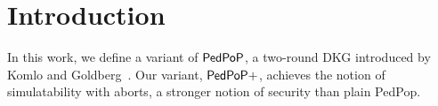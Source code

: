 \section{Introduction}

In this work,
we define a variant of $\mathsf{PedPoP}$,
a two-round DKG introduced by Komlo and Goldberg~\cite{KomGol2021}.
Our variant,
$\mathsf{PedPoP+}$,
achieves the notion of simulatability with aborts,
a stronger notion of security than plain PedPop.
